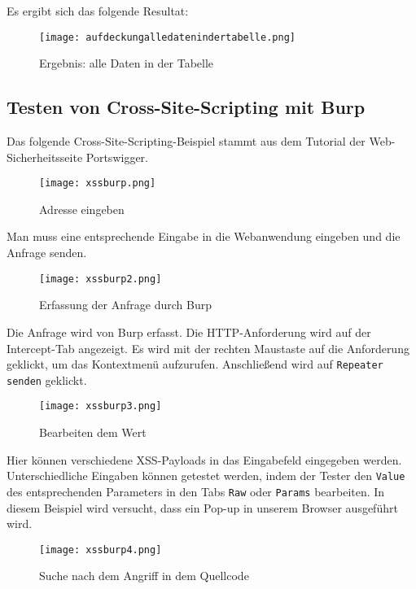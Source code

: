 Es ergibt sich das folgende Resultat:

\begin{figure}[h]
	\centering
	\texttt{[image: aufdeckungalledatenindertabelle.png]}
	\caption{Ergebnis: alle Daten in der Tabelle}
\end{figure}

\subsection{Testen von Cross-Site-Scripting mit Burp}

Das folgende Cross-Site-Scripting-Beispiel stammt aus dem Tutorial der Web-Sicherheitsseite Portswigger\cite{portswigger12}.

\begin{figure}[h]
	\centering
	\texttt{[image: xssburp.png]}
	\caption{Adresse eingeben}
\end{figure}

\newpage

Man muss eine entsprechende Eingabe in die Webanwendung eingeben und die Anfrage senden.

\begin{figure}[h]
	\centering
	\texttt{[image: xssburp2.png]}
	\caption{Erfassung der Anfrage durch Burp}
\end{figure}

Die Anfrage wird von Burp erfasst. Die HTTP-Anforderung wird auf der Intercept-Tab angezeigt. Es wird mit der rechten Maustaste auf die Anforderung geklickt, um das Kontextmenü aufzurufen. Anschließend wird auf \texttt{Repeater senden} geklickt.

\begin{figure}[h]
	\centering
	\texttt{[image: xssburp3.png]}
	\caption{Bearbeiten dem Wert}
\end{figure}

Hier können verschiedene XSS-Payloads in das Eingabefeld eingegeben werden. Unterschiedliche Eingaben können getestet werden, indem der Tester den \texttt{Value} des entsprechenden Parameters in den Tabs \texttt{Raw} oder \texttt{Params} bearbeiten. In diesem Beispiel wird versucht, dass ein Pop-up in unserem Browser ausgeführt wird.

\begin{figure}[h]
	\centering
	\texttt{[image: xssburp4.png]}
	\caption{Suche nach dem Angriff in dem Quellcode}
\end{figure}

